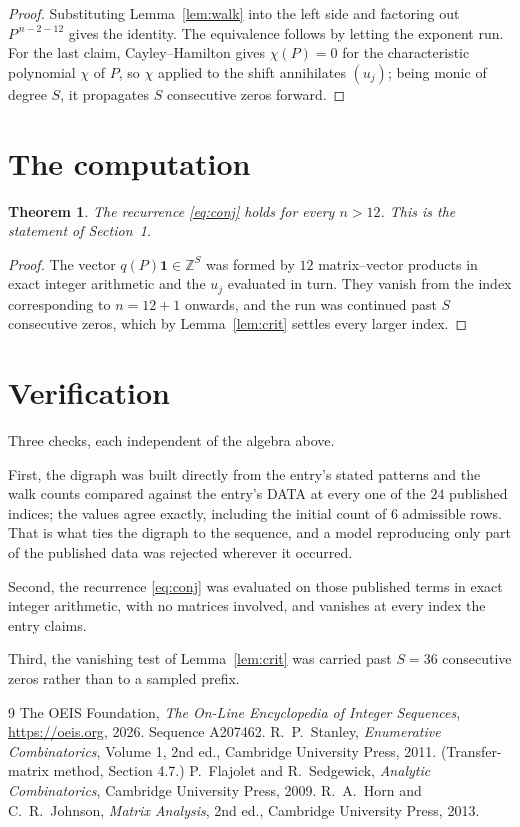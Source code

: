 \documentclass[11pt,a4paper]{article}
\theoremstyle{plain}
\newtheorem{theorem}{Theorem}
\theoremstyle{definition}
\begin{document}
\begin{proof}
Substituting Lemma~\ref{lem:walk} into the left side and factoring out
$P^{\,n-2-12}$ gives the identity. The equivalence follows by letting the exponent
run. For the last claim, Cayley--Hamilton gives $\chi(P)=0$ for the characteristic
polynomial $\chi$ of $P$, so $\chi$ applied to the shift annihilates $(u_j)$; being monic of
degree $S$, it propagates $S$ consecutive zeros forward.
\end{proof}

\section{The computation}

\begin{theorem}
The recurrence \eqref{eq:conj} holds for every $n>12$. This is the statement of
Section~1.
\end{theorem}

\begin{proof}
The vector $q(P)\mathbf{1}\in\mathbb{Z}^{S}$ was formed by $12$ matrix--vector
products in exact integer arithmetic and the $u_j$ evaluated in turn. They vanish from the
index corresponding to $n=12+1$ onwards, and the run was continued past $S$ consecutive
zeros, which by Lemma~\ref{lem:crit} settles every larger index.
\end{proof}

\section{Verification}

Three checks, each independent of the algebra above.

First, the digraph was built directly from the entry's stated patterns and the walk counts
compared against the entry's DATA at every one of the $24$ published indices; the
values agree exactly, including the initial count of $6$ admissible rows. That is
what ties the digraph to the sequence, and a model reproducing only part of the published
data was rejected wherever it occurred.

Second, the recurrence \eqref{eq:conj} was evaluated on those published terms in exact
integer arithmetic, with no matrices involved, and vanishes at every index the entry claims.

Third, the vanishing test of Lemma~\ref{lem:crit} was carried past $S=36$ consecutive
zeros rather than to a sampled prefix.

\begin{thebibliography}{9}
 The OEIS Foundation, \emph{The On-Line Encyclopedia of Integer
Sequences}, \url{https://oeis.org}, 2026. Sequence A207462.
 R.~P.~Stanley, \emph{Enumerative Combinatorics}, Volume 1, 2nd ed.,
Cambridge University Press, 2011. (Transfer-matrix method, Section 4.7.)
 P.~Flajolet and R.~Sedgewick, \emph{Analytic Combinatorics}, Cambridge
University Press, 2009.
 R.~A.~Horn and C.~R.~Johnson, \emph{Matrix Analysis}, 2nd ed., Cambridge
University Press, 2013.
\end{thebibliography}
\end{document}
